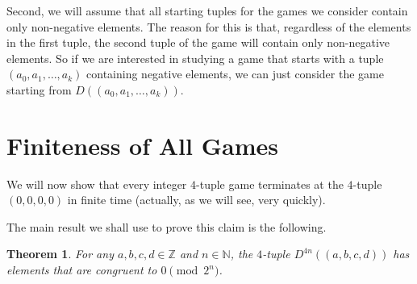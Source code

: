\documentclass[12pt]{amsart}
\newtheorem{theorem}{Theorem}[section]
\newcommand{\z}{\mathbb{Z}}
\newcommand{\diff}{D}
\newcommand{\znn}{\mathbb{N}}
\begin{document}
Second, we will assume that all starting tuples for the games we consider contain only non-negative elements. The reason for this is that, regardless of the elements in the first tuple, the second tuple of the game will contain only non-negative elements. So if we are interested in studying a game that starts with a tuple $(a_0, a_1, \dots, a_k)$ containing negative elements, we can just consider the game starting from $\diff((a_0, a_1, \dots, a_k))$.

\section{Finiteness of All Games\label{sec:convergence}}

We will now show that every integer $4$-tuple game terminates at the $4$-tuple $(0,0,0,0)$ in finite time (actually, as we will see, very quickly).

The main result we shall use to prove this claim is the following.
\begin{theorem}
For any $a,b,c,d \in \z$ and $n \in \znn$, the $4$-tuple $\diff^{4n}((a, b, c, d))$ has elements that are congruent to $0\pmod{2^n}$.
\label{thm:pow2}
\end{theorem}
\end{document}
